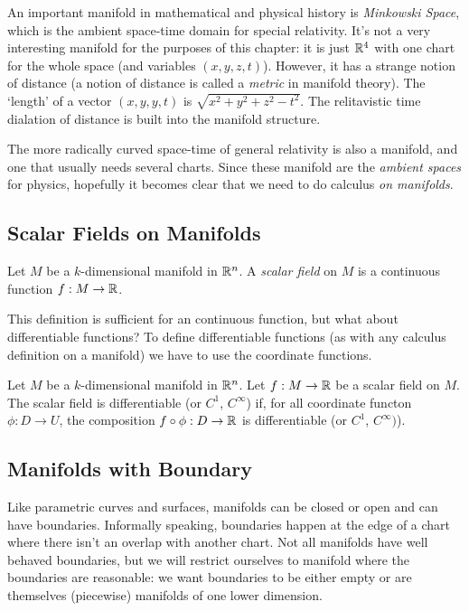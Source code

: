 \documentclass[fleqn,letterpaper]{report}
\begin{document}
\begin{example}
An important manifold in mathematical and physical history is
\emph{Minkowski Space}, which is the ambient space-time domain
for special relativity. It's not a very interesting manifold
for the purposes of this chapter: it is just $\mathbb{R}^4$ with one
chart for the whole space (and variables $(x,y,z,t)$).
However, it has a strange notion of distance (a notion of
distance is called a \emph{metric} in manifold theory). The
`length' of a vector $(x,y,y,t)$ is $\sqrt{x^2 + y^2 + z^2 -
t^2}$. The relitavistic time dialation of distance is built
into the manifold structure. 

The more radically curved space-time of general relativity is
also a manifold, and one that usually needs several charts.
Since these manifold are the \emph{ambient spaces} for
physics, hopefully it becomes clear that we need to do
calculus \emph{on manifolds}. 
\end{example}

\subsection{Scalar Fields on Manifolds}
\label{manifold-scalar-fields}

\begin{defn}
Let $M$ be a $k$-dimensional manifold in $\mathbb{R}^n$. 
A \emph{scalar field} on $M$ is a continuous function 
$f: M \rightarrow \mathbb{R}$. 
\end{defn}
This definition is sufficient for an continuous function, but what
about differentiable functions? To define differentiable
functions (as with any calculus definition on a manifold) we
have to use the coordinate functions. 
\begin{defn}
\label{def-differentiable-scalar-field}
Let $M$ be a $k$-dimensional manifold in $\mathbb{R}^n$. 
Let $f: M \rightarrow \mathbb{R}$ be a 
scalar field on $M$. The scalar field is
differentiable (or $C^1$, $C^\infty$) if, for all coordinate
functon $\phi: D \rightarrow U$, the composition $f \circ
\phi :D \rightarrow \mathbb{R}$ is differentiable (or $C^1$,
$C^\infty)$). 
\end{defn} 

\subsection{Manifolds with Boundary}
\label{manifolds-with-boundary}

Like parametric curves and surfaces, manifolds can be closed
or open and can have boundaries. Informally speaking,
boundaries happen at the edge of a chart where there isn't an
overlap with another chart. Not all manifolds have well
behaved boundaries, but we will restrict ourselves to manifold
where the boundaries are reasonable: we want boundaries to be
either empty or are themselves (piecewise) manifolds of one
lower dimension.
\end{document}
